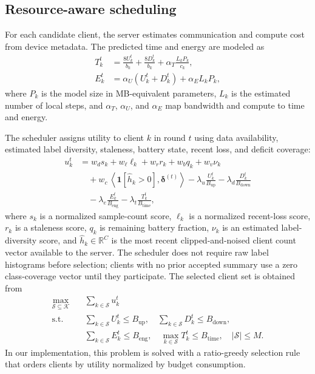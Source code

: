 \documentclass[10pt,journal]{IEEEtran}
\newcommand{\R}{\mathbb{R}}
\newcommand{\inner}[2]{\left\langle #1, #2 \right\rangle}
\newcommand{\deficit}{\boldsymbol{\delta}}
\begin{document}
\subsection{Resource-aware scheduling}
For each candidate client, the server estimates communication and compute cost from device metadata. The predicted time and energy are modeled as
\begin{align}
T_k^t &= \frac{8U_k^t}{b_k} + \frac{8D_k^t}{b_k} + \alpha_T\frac{L_kP_k}{c_k}, \\
E_k^t &= \alpha_U(U_k^t + D_k^t) + \alpha_E L_kP_k,
\end{align}
where $P_k$ is the model size in MB-equivalent parameters, $L_k$ is the estimated number of local steps, and $\alpha_T$, $\alpha_U$, and $\alpha_E$ map bandwidth and compute to time and energy.

The scheduler assigns utility to client $k$ in round $t$ using data availability, estimated label diversity, staleness, battery state, recent loss, and deficit coverage:
\begin{align}
u_k^t &= w_d s_k + w_{\ell}\ell_k + w_r r_k + w_b q_k + w_v \nu_k
\nonumber\\
&\quad + w_c\,\inner{\mathbf{1}[\widehat{h}_k>0]}{\deficit^{(t)}}
- \lambda_u\frac{U_k^t}{B_{\text{up}}}
- \lambda_d\frac{D_k^t}{B_{\text{down}}}
\nonumber\\
&\quad
- \lambda_e\frac{E_k^t}{B_{\text{eng}}} 
- \lambda_t\frac{T_k^t}{B_{\text{time}}},
\label{eq:utility}
\end{align}
where $s_k$ is a normalized sample-count score, $\ell_k$ is a normalized recent-loss score, $r_k$ is a staleness score, $q_k$ is remaining battery fraction, $\nu_k$ is an estimated label-diversity score, and $\widehat{h}_k\in\R^C$ is the most recent clipped-and-noised client count vector available to the server. The scheduler does not require raw label histograms before selection; clients with no prior accepted summary use a zero class-coverage vector until they participate. The selected client set is obtained from
\begin{align}
\max_{\mathcal{S}\subseteq\mathcal{K}} \quad & \sum_{k\in\mathcal{S}} u_k^t \\
\text{s.t.}\quad
& \sum_{k\in\mathcal{S}} U_k^t \le B_{\text{up}}, \quad
\sum_{k\in\mathcal{S}} D_k^t \le B_{\text{down}}, \nonumber\\
& \sum_{k\in\mathcal{S}} E_k^t \le B_{\text{eng}}, \quad
\max_{k\in\mathcal{S}} T_k^t \le B_{\text{time}}, \quad
|\mathcal{S}| \le M. \nonumber
\end{align}
In our implementation, this problem is solved with a ratio-greedy selection rule that orders clients by utility normalized by budget consumption.
\end{document}
